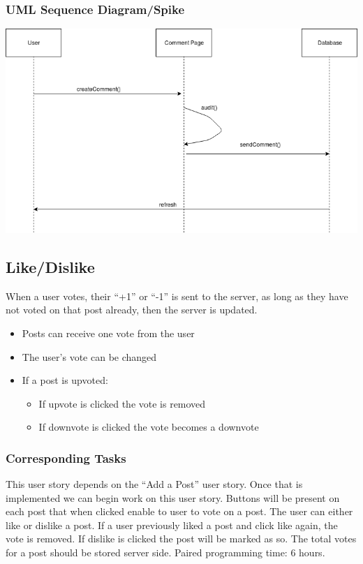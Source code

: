 \documentclass[12pt]{article}
\begin{document}
\subsubsection{UML Sequence Diagram/Spike}
\includegraphics[scale=0.5]{img/story_2.png}\linebreak

\subsection{Like/Dislike}
When a user votes, their “+1” or “-1” is sent to the server, as long as they
have not voted on that post already, then the server is updated.
\begin{itemize}
  \item Posts can receive one vote from the user
  \item The user’s vote can be changed
  \item If a post is upvoted:
  \begin{itemize}
    \item If upvote is clicked the vote is removed
    \item If downvote is clicked the vote becomes a downvote
  \end{itemize}
\end{itemize}
\subsubsection{Corresponding Tasks}
	This user story depends on the “Add a Post” user story.  Once that is implemented we can begin work on this user story.  Buttons will be present on each post that when clicked enable to user to vote on a post.  The user can either like or dislike a post.  If a user previously liked a post and click like again, the vote is removed.  If dislike is clicked the post will be marked as so.  The total votes for a post should be stored server side.  Paired programming time: 6 hours.
\end{document}
